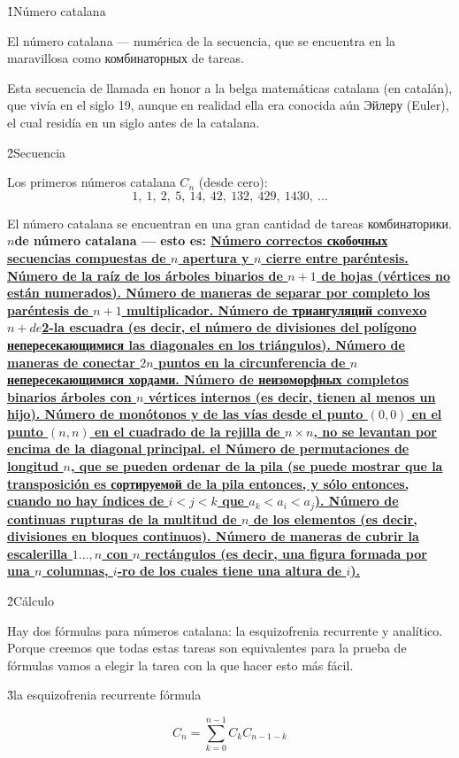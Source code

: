 \h1{Número catalana}

El número catalana --- numérica de la secuencia, que se encuentra en la maravillosa como комбинаторных de tareas.

Esta secuencia de llamada en honor a la belga matemáticas catalana (en catalán), que vivía en el siglo 19, aunque en realidad ella era conocida aún Эйлеру (Euler), el cual residía en un siglo antes de la catalana.

\h2{Secuencia}

Los primeros números catalana $C_n$ (desde cero):
$$ 1,\ 1,\ 2,\ 5,\ 14,\ 42,\ 132,\ 429,\ 1430,\ \ldots $$

El número catalana se encuentran en una gran cantidad de tareas комбинаторики. \bf{$n$de número catalana} --- esto es:
\ul{
\li Número correctos скобочных secuencias compuestas de $n$ apertura y $n$ cierre entre paréntesis.
\li Número de la raíz de los árboles binarios de $n+1$ de hojas (vértices no están numerados).
\li Número de maneras de separar por completo los paréntesis de $n+1$ multiplicador.
\li Número de триангуляций convexo $n+de$2-la escuadra (es decir, el número de divisiones del polígono непересекающимися las diagonales en los triángulos).
\li Número de maneras de conectar $2n$ puntos en la circunferencia de $n$ непересекающимися хордами.
\li Número de неизоморфных completos binarios árboles con $n$ vértices internos (es decir, tienen al menos un hijo).
\li Número de monótonos y de las vías desde el punto $(0,0)$ en el punto $(n,n)$ en el cuadrado de la rejilla de $n \times n$, no se levantan por encima de la diagonal principal.
\li el Número de permutaciones de longitud $n$, que se pueden ordenar de la pila (se puede mostrar que la transposición es сортируемой de la pila entonces, y sólo entonces, cuando no hay índices de $i<j<k$ que $a_k<a_i<a_j$).
\li Número de continuas rupturas de la multitud de $n$ de los elementos (es decir, divisiones en bloques continuos).
\li Número de maneras de cubrir la escalerilla $1 \ldots, n$ con $n$ rectángulos (es decir, una figura formada por una $n$ columnas, $i$-ro de los cuales tiene una altura de $i$).
}

\h2{Cálculo}

Hay dos fórmulas para números catalana: la esquizofrenia recurrente y analítico. Porque creemos que todas estas tareas son equivalentes para la prueba de fórmulas vamos a elegir la tarea con la que hacer esto más fácil.

\h3{la esquizofrenia recurrente fórmula}

$$ C_n = \sum_{k=0}^{n-1} C_k C_{n-1-k} $$

